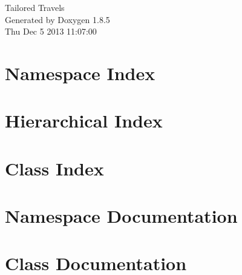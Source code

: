 \documentclass[twoside]{book}
\newcommand{\clearemptydoublepage}{%
  \newpage{\pagestyle{empty}\cleardoublepage}%
}
\begin{document}
\hypersetup{pageanchor=false}
\begin{titlepage}
\vspace*{7cm}
\begin{center}%
{\Large Tailored Travels }\\
\vspace*{1cm}
{\large Generated by Doxygen 1.8.5}\\
\vspace*{0.5cm}
{\small Thu Dec 5 2013 11:07:00}\\
\end{center}
\end{titlepage}
\clearemptydoublepage
\tableofcontents
\clearemptydoublepage
{}
\hypersetup{pageanchor=true}

\chapter{Namespace Index}

\chapter{Hierarchical Index}

\chapter{Class Index}

\chapter{Namespace Documentation}

\chapter{Class Documentation}













\newpage
{}
{}
\printindex
\end{document}
